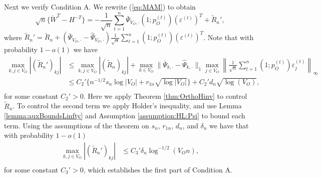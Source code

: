 \documentclass[opre,nonblindrev]{informs3} %
\begin{document}
\begin{APPENDIX}{}
	Next we verify Condition A. We rewrite (\ref{eq:MAM}) to obtain
	\begin{equation}\label{eq:MAMprime} \sqrt{n}\{ \check W^T - H^{-T}\} = - \frac{1}{\sqrt{n}}\sum_{t=1}^n \bar \Psi_{V_O,\cdot} (1;{p}_O^{(t)})(\varepsilon^{(t)})^T  + \tilde R_n',  \end{equation}
	where $\tilde R_n' = \tilde{R}_n + (\bar \Psi_{V_O,\cdot}-\hat \Psi_{V_O,\cdot}) \frac{1}{\sqrt{n}}\sum_{t=1}^n (1;{p}_O^{(t)})(\varepsilon^{(t)})^T $. Note that with probability $1-o(1)$ we have
	$$
	\begin{array}{rl}
	\max_{k,j\in V_O}| (\tilde R_{n}')_{{kj}}| & \leq \max_{k,j\in V_O}|(\tilde R_{n})_{kj}| + \max_{k\in V_O}\|\bar \Psi_{k,\cdot}-\hat\Psi_{k,\cdot}\|_1 \max_{j\in V_O}\left\| \frac{1}{\sqrt{n}}\sum_{t=1}^n (1;{p}_O^{(t)})\varepsilon_j^{(t)} \right\|_\infty\\
	& \leq C_2'\{n^{-1/2}s_n\log |V_O| + r_{1n}\sqrt{\log |V_O|}\}  + C_2'd_n \sqrt{\log (V_O)},\\
	\end{array}
	$$
	for some constant $C_2'>0$.
 Here we apply Theorem \ref{thm:OrthoHinv} to control $\tilde R_n$. 
To control the second term we apply Holder's inequality, and use Lemma \ref{lemma:auxBoundsLinfty} and Assumption \ref{assumption:HL:Psi} to bound each term. 
 Using the 
 assumptions of the theorem on $s_n$, $r_{1n}$, $d_n$, and $\delta_n$ we have that with probability $1-o(1)$
	$$
	\begin{array}{rl}
	\max_{k,j\in V_O}|(\tilde R_{n}')_{kj}| & \leq C_3' \delta_n  \log^{-1/2}(V_On),\\
	\end{array}
	$$
	for some constant $C_3'>0$,
	which establishes the first part of Condition A.
	

\end{APPENDIX}
\end{document}
